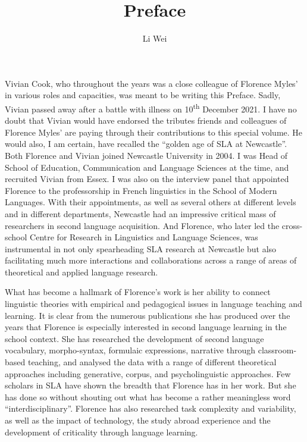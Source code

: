 \documentclass[output=paper]{langscibook}
\author{Li Wei\orcid{}\affiliation{UCL Institute of Education, University College London}}
\title{Preface}
\begin{document}
\AffiliationsWithoutIndexing{}
\maketitle 

\noindent Vivian Cook, who throughout the years was a close colleague of Florence Myles' in various roles and capacities, was meant to be writing this Preface. Sadly, Vivian passed away after a battle with illness on 10\textsuperscript{th} December 2021. I have no doubt that Vivian would have endorsed the tributes friends and colleagues of Florence Myles’ are paying through their contributions to this special volume. He would also, I am certain, have recalled the ``golden age of SLA at Newcastle''. Both Florence and Vivian joined Newcastle University in 2004. I was Head of School of Education, Communication and Language Sciences at the time, and recruited Vivian from Essex. I was also on the interview panel that appointed Florence to the professorship in French linguistics in the School of Modern Languages. With their appointments, as well as several others at different levels and in different departments, Newcastle had an impressive critical mass of researchers in second language acquisition. And Florence, who later led the cross-school Centre for Research in Linguistics and Language Sciences, was instrumental in not only spearheading SLA research at Newcastle but also facilitating much more interactions and collaborations across a range of areas of theoretical and applied language research.

What has become a hallmark of Florence’s work is her ability to connect linguistic theories with empirical and pedagogical issues in language teaching and learning. It is clear from the numerous publications she has produced over the years that Florence is especially interested in second language learning in the school context. She has researched the development of second language vocabulary, morpho-syntax, formulaic expressions, narrative through classroom-based teaching, and analysed the data with a range of different theoretical approaches including generative, corpus, and psycholinguistic approaches. Few scholars in SLA have shown the breadth that Florence has in her work. But she has done so without shouting out what has become a rather meaningless word ``interdisciplinary''. Florence has also researched task complexity and variability, as well as the impact of technology, the study abroad experience and the development of criticality through language learning. 
\end{document}
